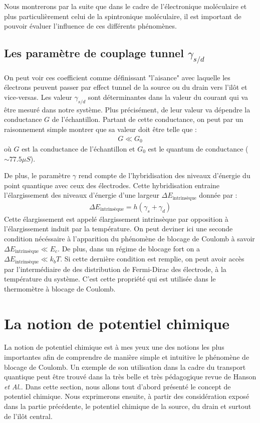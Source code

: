 Nous montrerons par la suite que dans le cadre de l'électronique moléculaire et plus particulièrement celui de la spintronique moléculaire, il est important de pouvoir évaluer l'influence de ces différents phénomènes.

\subsection{Les paramètre de couplage tunnel $\gamma_{s/d}$}
On peut voir ces coefficient comme définissant "l'aisance" avec laquelle les électrons peuvent passer par effect tunnel de la source ou du drain vers l'il\^ot et vice-versas. Les valeur $\gamma_{s/d}$ sont déterminantes dans la valeur du courant qui va \^etre mesuré dans notre système. Plus précisément, de leur valeur va dépendre la conductance $G$ de l'échantillon. Partant de cette conductance, on peut par un raisonnement simple montrer que sa valeur doit \^etre telle que :
\begin{eqnarray}
G \ll G_0
\end{eqnarray}
où $G$ est la conductance de l'échantillon et $G_0$ est le quantum de conductance ($\sim 77.5 \mu S$).


De plus, le paramètre $\gamma$ rend compte de l'hybridisation des niveaux d'énergie du point quantique avec ceux des électrodes. Cette hybridisation entraine l'élargissement des niveaux d'énergie d'une largeur $\Delta E_{\text{intrinsèque}}$ donnée par :
\begin{eqnarray}
\Delta E_{\text{intrinsèque}} = h (\gamma_s + \gamma_d)
\end{eqnarray}
Cette élargissement est appelé élargissement intrinsèque par opposition à l'élargissement induit par la température. On peut deviner ici une seconde condition nécéssaire à l'apparition du phénomène de blocage de Coulomb à savoir $\Delta E_{\text{intrinsèque}} \ll E_c$. De plus, dans un régime de blocage fort on a $\Delta E_{\text{intrinsèque}} \ll k_bT$. Si cette dernière condition est remplie, on peut avoir accès par l'intermédiaire de des distribution de Fermi-Dirac des électrode, à la température du système. C'est cette propriété qui est utilisée dans le thermomètre à blocage de Coulomb.





\section{La notion de potentiel chimique}
La notion de potentiel chimique est à mes yeux une des notions les plus importantes afin de comprendre de manière simple et intuitive le phénomène de blocage de Coulomb. Un exemple de son utilisation dans la cadre du transport quantique peut \^etre trouvé dans la très belle et très pédagogique revue de Hanson \textit{et Al.}. Dans cette section, nous allons tout d'abord présenté le concept de potentiel chimique. Nous exprimerons ensuite, à partir des considération exposé dans la partie précédente, le potentiel chimique de la source, du drain et surtout de l'ilôt central.

